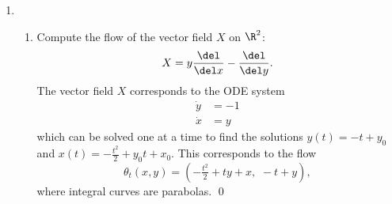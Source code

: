 \documentclass[12pt,letterpaper]{article}
\begin{document}
\begin{enumerate}
\begin{proof}
\begin{enumerate}
	\item \textsc{Antisymmetry}:
	\begin{align*}
	[X,Y]f&=XYf-YXf\\
	&=-(-XYf+YXf)\\
	&=-[Y,X]f
	\end{align*}
	
	\item \textsc{Jacobi Identity}:
	
	By examining some of the computations in the bilinearity part of this proof, we can see that 
	\begin{align*}
	[Y,X]&=Z,\\
	[X,Z]&=Y, \text{ and}\\
	[Z,Y]&=X.
	\end{align*}
	Thus 
	\begin{align*}
	[X,[Y,Z]]+[Y,[Z,X]]+[Z,[X,Y]]&=[X,-X]+[Y,-Y]+[Z,-Z]\\
	&=0+0+0
	\end{align*}
	\end{enumerate}
Therefore, $A$ is a 3-dimensional vector space with a bracket operation having the bilinearity, antisymmetry, and Jacobi identity properties, so $A$ is a 3-dimensional Lie algebra.
\end{proof}

\pagebreak
\item %
	\begin{enumerate} [label=\alph*)]
	\item Compute the flow of the vector field $X$ on $\R^2$: 
$$X=y\frac{\del}{\del x}-\frac{\del}{\del y}.$$
	\answer The vector field $X$ corresponds to the ODE system 
	\begin{align*}
	\dot{y}&=-1\\
	\dot{x}&=y
	\end{align*}	
which can be solved one at a time to find the solutions $y(t)=-t+y_0$ and $x(t)=-\frac{t^2}{2}+y_0t+x_0$. This corresponds to the flow 
$$\theta_t(x,y)=(-\tfrac{t^2}{2}+ty+x, \,\, -t+y),$$
where integral curves are parabolas. \qed


\end{enumerate}
\end{enumerate}
\end{document}
